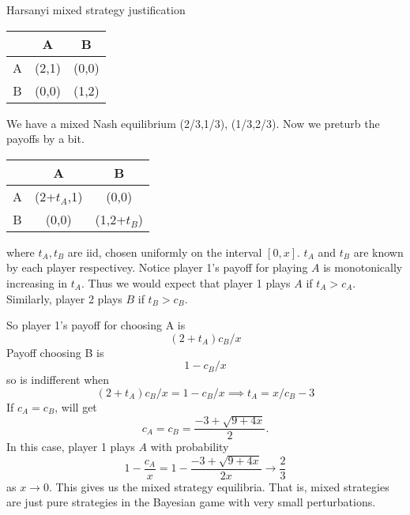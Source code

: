 \begin{aexample}{Harsanyi mixed strategy justification}{}
    \begin{center}
        \begin{tabular}{|c|c c|}
            \hline  & A & B  \\
            \hline 
            A & (2,1) & (0,0)\\
            \hline
             B & (0,0) & (1,2)\\\hline
        \end{tabular} 
    \end{center}
    We have a mixed Nash equilibrium (2/3,1/3), (1/3,2/3).
    Now we preturb the payoffs by a bit.
    \begin{center}
        \begin{tabular}{|c|c c|}
            \hline  & A & B  \\
            \hline 
            A & (2+$t_A$,1) & (0,0)\\
            \hline
             B & (0,0) & (1,2+$t_B$)\\\hline
        \end{tabular} 
    \end{center}
    where $t_A,t_B$ are iid, chosen uniformly on the interval $[0,x]$. $t_A$ and $t_B$ are known by each player respectivey.
    Notice player 1's payoff for playing $A$ is monotonically increasing in $t_A$. Thus we would expect that player 1 plays $A$ if $t_A>c_A$. Similarly, player 2 plays $B$ if $t_B>c_B$.
    
    So player 1's payoff for choosing A is \[
    (2+t_A)c_B/x
    \]
    Payoff choosing B is\[
    1-c_B/x
    \]
    so is indifferent when \[
        (2+t_A)c_B/x=1-c_B/x\implies t_A = x/c_B-3
    \]
    If $c_A=c_B$, will get \[
    c_A=c_B=\frac{-3+\sqrt{9+4x}}{2}.
    \]
    In this case, player 1 plays $A$ with probability \[
    1-\frac{c_A}{x} = 1-\frac{-3+\sqrt{9+4x}}{2x} \to \frac{2}{3} 
    \]as 
    $x\to 0$. This gives us the mixed strategy equilibria. That is, mixed strategies are just pure strategies in the Bayesian game with very small perturbations.
\end{aexample}